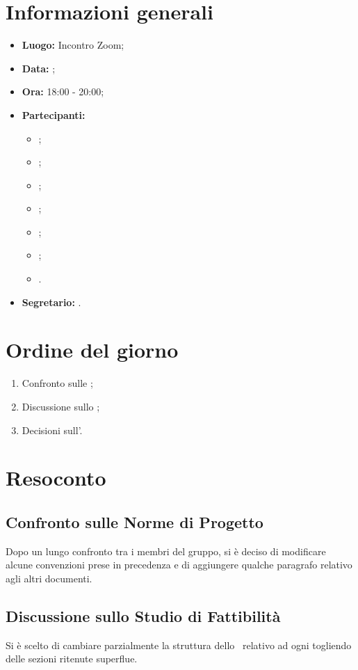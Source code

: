 \section{Informazioni generali}
\begin{itemize}
\item \textbf{Luogo:} Incontro Zoom;
\item \textbf{Data:} \Data;
\item \textbf{Ora:} 18:00 - 20:00;
\item \textbf{Partecipanti:}
	\begin{itemize}
		\item \BL{}; 
		\item \FF{};
		\item \MM{}; 
		\item \PC{};
		\item \TG{};
		\item \TL{};
		\item \VD{}.
	\end{itemize} 
\item \textbf{Segretario:} \PC{}.
\end{itemize}

\section{Ordine del giorno}
\begin{enumerate}
 \item Confronto sulle \NdP;
 \item Discussione sullo \SdF;
 \item Decisioni sull'\AdR.
\end{enumerate}

\section{Resoconto}
\subsection{Confronto sulle Norme di Progetto}
Dopo un lungo confronto tra i membri del gruppo, si è deciso di modificare alcune convenzioni prese in precedenza e di aggiungere qualche paragrafo relativo agli altri documenti.
\subsection{Discussione sullo Studio di Fattibilità}
Si è scelto di cambiare parzialmente la struttura dello \SdF\ relativo ad ogni  togliendo delle sezioni ritenute superflue.

